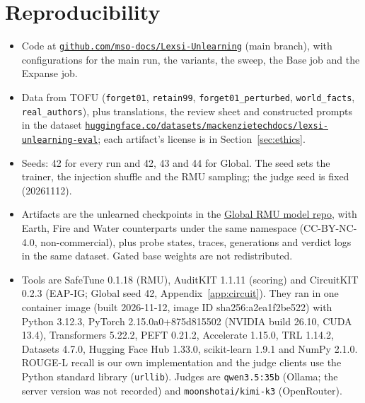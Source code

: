 \documentclass[10pt,twocolumn]{article}
\newcommand{\code}[1]{\texttt{#1}}
\begin{document}
\section{Reproducibility}
\label{sec:repro}
\begin{itemize}
  \item Code at \href{https://github.com/mso-docs/Lexsi-Unlearning}{\nolinkurl{github.com/mso-docs/Lexsi-Unlearning}} (main branch), with configurations for the main run, the variants, the sweep, the Base job and the Expanse job.
  \item Data from TOFU (\code{forget01}, \code{retain99}, \code{forget01\_perturbed}, \code{world\_facts}, \code{real\_authors}), plus translations, the review sheet and constructed prompts in the dataset \href{https://huggingface.co/datasets/mackenzietechdocs/lexsi-unlearning-eval}{\nolinkurl{huggingface.co/datasets/mackenzietechdocs/lexsi-unlearning-eval}}; each artifact's license is in Section~\ref{sec:ethics}.
  \item Seeds: 42 for every run and 42, 43 and 44 for Global. The seed sets the trainer, the injection shuffle and the RMU sampling; the judge seed is fixed (20261112).
  \item Artifacts are the unlearned checkpoints in the \href{https://huggingface.co/mackenzietechdocs/lexsi-tiny-aya-global-rmu}{Global RMU model repo}, with Earth, Fire and Water counterparts under the same namespace (CC-BY-NC-4.0, non-commercial), plus probe states, traces, generations and verdict logs in the same dataset. Gated base weights are not redistributed.
  \item Tools are SafeTune 0.1.18 (RMU), AuditKIT 1.1.11 (scoring) and CircuitKIT 0.2.3 (EAP-IG; Global seed 42, Appendix~\ref{app:circuit}). They ran in one container image (built 2026-11-12, image ID sha256:a2ea1f2be522) with Python 3.12.3, PyTorch 2.15.0a0+875d815502 (NVIDIA build 26.10, CUDA 13.4), Transformers 5.22.2, PEFT 0.21.2, Accelerate 1.15.0, TRL 1.14.2, Datasets 4.7.0, Hugging Face Hub 1.33.0, scikit-learn 1.9.1 and NumPy 2.1.0. ROUGE-L recall is our own implementation and the judge clients use the Python standard library (\code{urllib}). Judges are \code{qwen3.5:35b} (Ollama; the server version was not recorded) and \code{moonshotai/kimi-k3} (OpenRouter).
\end{itemize}


{\scriptsize}

\appendix
\end{document}
